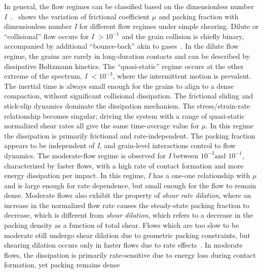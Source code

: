 In general, the flow regimes can be classified based on the dimensionless 
number \textit{I}~\citep{DaCruz2005}.~ shows the variation of 
frictional coefficient $\mu$ and packing fraction with dimensionless 
number \textit{I} for different flow regimes under simple shearing. Dilute or 
``collisional'' flow occurs for \textit{I} $>10^{-1}$ and the grain collision 
is chiefly binary, accompanied  by additional ``bounce-back'' akin to 
gases~\citep{Kamrin2008}. In the dilute flow regime, the grains are rarely in 
long-duration contacts and can be described by dissipative Boltzmann kinetics. 
The ``quasi-static'' regime occurs at the other extreme of the spectrum, 
\textit{I} $<10^{-3}$, where the intermittent motion is prevalent. The inertial 
time is always small enough for the grains to align to a dense compaction, 
without significant collisional dissipation. The frictional sliding and 
stick-slip dynamics dominate the dissipation mechanism. The stress/strain-rate 
relationship becomes singular; driving the system with a range of quasi-static 
normalized shear rates all give the same time-average value for $\mu$. In this 
regime the dissipation is primarily frictional and rate-independent. The 
packing fraction appears to be independent of \textit{I}, and grain-level 
interactions control to flow dynamics. The moderate-flow regime is observed for 
\textit{I} between $10^{-3} \mbox{and }10^{-1}$, characterized by faster flows, 
with a high rate of contact formation and more energy dissipation per impact. 
In this regime, \textit{I} has a one-one relationship with $\mu$ and is large 
enough for rate dependence, but small enough for the flow to remain dense. 
Moderate flows also exhibit the property of \textit{shear rate dilation}, 
where an increase in the normalized flow rate causes the steady-state packing 
fraction to decrease, which is different from \textit{shear dilation}, 
which refers to a decrease in the packing density as a function of total shear. 
Flows which are too slow to be moderate still undergo shear dilation due to 
geometric packing constraints, but shearing dilation occurs only in faster 
flows due to rate effects~\citep{Kamrin2008}. In moderate flows, the 
dissipation is primarily rate-sensitive due to energy loss during contact 
formation, yet packing remains dense

